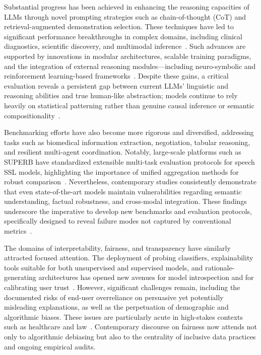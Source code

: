 \documentclass[sigconf]{acmart}
\begin{document}
Substantial progress has been achieved in enhancing the reasoning capacities of LLMs through novel prompting strategies such as chain-of-thought (CoT) and retrieval-augmented demonstration selection. These techniques have led to significant performance breakthroughs in complex domains, including clinical diagnostics, scientific discovery, and multimodal inference~\cite{ref23,ref38,ref47,ref58,ref61,ref78,ref86,ref87,ref89}. Such advances are supported by innovations in modular architectures, scalable training paradigms, and the integration of external reasoning modules—including neuro-symbolic and reinforcement learning-based frameworks~\cite{ref49,ref52,ref57,ref86,ref87,ref89}. Despite these gains, a critical evaluation reveals a persistent gap between current LLMs' linguistic and reasoning abilities and true human-like abstraction; models continue to rely heavily on statistical patterning rather than genuine causal inference or semantic compositionality~\cite{ref23,ref49,ref57}.

Benchmarking efforts have also become more rigorous and diversified, addressing tasks such as biomedical information extraction, negotiation, tabular reasoning, and resilient multi-agent coordination. Notably, large-scale platforms such as SUPERB have standardized extensible multi-task evaluation protocols for speech SSL models, highlighting the importance of unified aggregation methods for robust comparison~\cite{ref101}. Nevertheless, contemporary studies consistently demonstrate that even state-of-the-art models maintain vulnerabilities regarding semantic understanding, factual robustness, and cross-modal integration. These findings underscore the imperative to develop new benchmarks and evaluation protocols, specifically designed to reveal failure modes not captured by conventional metrics~\cite{ref13,ref38,ref47,ref56,ref66,ref67,ref101}.

The domains of interpretability, fairness, and transparency have similarly attracted focused attention. The deployment of probing classifiers, explainability tools suitable for both unsupervised and supervised models, and rationale-generating architectures has opened new avenues for model introspection and for calibrating user trust~\cite{ref31,ref32,ref36,ref48,ref50,ref51,ref54,ref55}. However, significant challenges remain, including the documented risks of end-user overreliance on persuasive yet potentially misleading explanations, as well as the perpetuation of demographic and algorithmic biases. These issues are particularly acute in high-stakes contexts such as healthcare and law~\cite{ref31,ref33,ref36,ref39,ref45,ref53}. Contemporary discourse on fairness now attends not only to algorithmic debiasing but also to the centrality of inclusive data practices and ongoing empirical audits.
\end{document}
